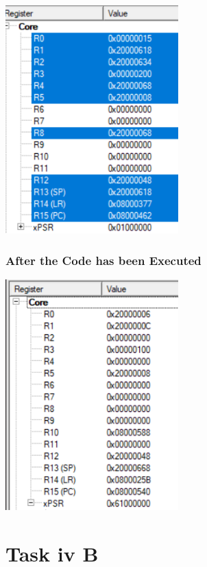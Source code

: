 \documentclass{article}
\begin{document}
\begin{center}
    \includegraphics[width=0.5\textwidth]{task_iv_A_before.png}
\end{center}

\subsubsection{After the Code has been Executed}

\begin{center}
    \includegraphics[width=0.5\textwidth]{task_iv_A_after.png}
\end{center}

\section{Task iv B}
\end{document}
